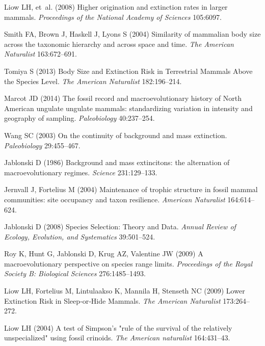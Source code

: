 \documentclass{pnastwo}
\begin{document}
\begin{article}
\begin{thebibliography}{10}
Liow LH, {et~al.}
\newblock (2008) {Higher origination and extinction rates in larger mammals}.
\newblock \emph{Proceedings of the National Academy of Sciences} 105:6097.

Smith FA, Brown J, Haskell J, Lyons S
\newblock (2004) {Similarity of mammalian body size across the taxonomic
  hierarchy and across space and time}.
\newblock \emph{The American Naturalist} 163:672--691.

Tomiya S
\newblock (2013) {Body Size and Extinction Risk in Terrestrial Mammals Above
  the Species Level}.
\newblock \emph{The American Naturalist} 182:196--214.

Marcot JD
\newblock (2014) {The fossil record and macroevolutionary history of North
  American ungulate ungulate mammals: standardizing variation in intensity and
  geography of sampling}.
\newblock \emph{Paleobiology} 40:237--254.

Wang SC
\newblock (2003) {On the continuity of background and mass extinction}.
\newblock \emph{Paleobiology} 29:455--467.

Jablonski D
\newblock (1986) {Background and mass extincitons: the alternation of
  macroevolutionary regimes}.
\newblock \emph{Science} 231:129--133.

Jernvall J, Fortelius M
\newblock (2004) {Maintenance of trophic structure in fossil mammal
  communities: site occupancy and taxon resilience.}
\newblock \emph{American Naturalist} 164:614--624.

Jablonski D
\newblock (2008) {Species Selection: Theory and Data}.
\newblock \emph{Annual Review of Ecology, Evolution, and Systematics}
  39:501--524.

Roy K, Hunt G, Jablonski D, Krug AZ, Valentine JW
\newblock (2009) {A macroevolutionary perspective on species range limits.}
\newblock \emph{Proceedings of the Royal Society B: Biological Sciences}
  276:1485--1493.

Liow LH, Fortelius M, Lintulaakso K, Mannila H, Stenseth NC
\newblock (2009) {Lower Extinction Risk in Sleep‐or‐Hide Mammals}.
\newblock \emph{The American Naturalist} 173:264--272.

Liow LH
\newblock (2004) {A test of Simpson's "rule of the survival of the relatively
  unspecialized" using fossil crinoids.}
\newblock \emph{The American naturalist} 164:431--43.


\end{thebibliography}
\end{article}
\end{document}
